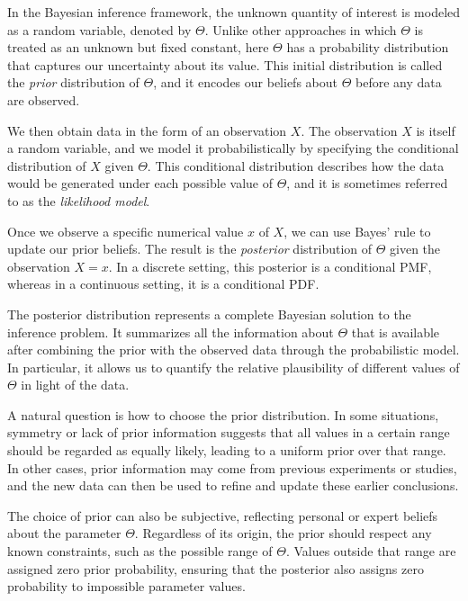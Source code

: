 In the Bayesian inference framework, the unknown quantity of interest is modeled as a random variable, denoted by \(\Theta\).  
Unlike other approaches in which \(\Theta\) is treated as an unknown but fixed constant, here \(\Theta\) has a probability distribution that captures our uncertainty about its value.  
This initial distribution is called the \textit{prior} distribution of \(\Theta\), and it encodes our beliefs about \(\Theta\) before any data are observed.  

We then obtain data in the form of an observation \(X\).  
The observation \(X\) is itself a random variable, and we model it probabilistically by specifying the conditional distribution of \(X\) given \(\Theta\).  
This conditional distribution describes how the data would be generated under each possible value of \(\Theta\), and it is sometimes referred to as the \textit{likelihood model}.  

Once we observe a specific numerical value \(x\) of \(X\), we can use Bayes' rule to update our prior beliefs.  
The result is the \textit{posterior} distribution of \(\Theta\) given the observation \(X = x\).  
In a discrete setting, this posterior is a conditional PMF, whereas in a continuous setting, it is a conditional PDF.  

The posterior distribution represents a complete Bayesian solution to the inference problem.  
It summarizes all the information about \(\Theta\) that is available after combining the prior with the observed data through the probabilistic model.  
In particular, it allows us to quantify the relative plausibility of different values of \(\Theta\) in light of the data.  

A natural question is how to choose the prior distribution.  
In some situations, symmetry or lack of prior information suggests that all values in a certain range should be regarded as equally likely, leading to a uniform prior over that range.  
In other cases, prior information may come from previous experiments or studies, and the new data can then be used to refine and update these earlier conclusions.  

The choice of prior can also be subjective, reflecting personal or expert beliefs about the parameter \(\Theta\).  
Regardless of its origin, the prior should respect any known constraints, such as the possible range of \(\Theta\).  
Values outside that range are assigned zero prior probability, ensuring that the posterior also assigns zero probability to impossible parameter values.  

